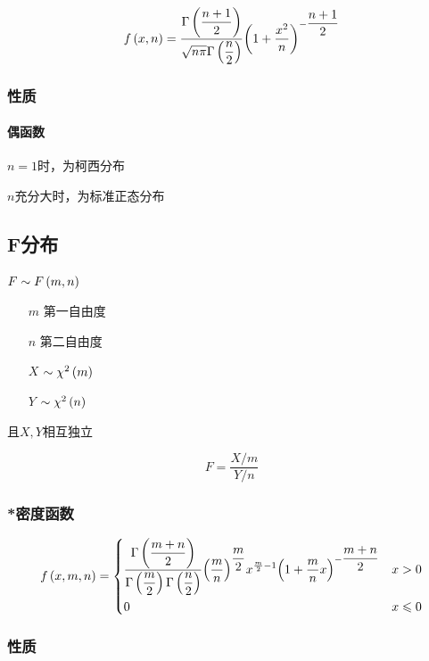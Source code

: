 \documentclass{article}
\begin{document}
\[f\left(x,n\right)=\frac{\Gamma\left(\dfrac{n+1}2\right)}{\sqrt{n\pi}\Gamma\left(\dfrac n2\right)}{\left(1+\frac{x^2}n\right)}^{-\dfrac{n+1}2}\]

\subsubsection{性质}

\paragraph{偶函数}

$n=1$时，为柯西分布

$n$充分大时，为标准正态分布

\subsection{F分布}

$F\sim F\left(m,n\right)$

\begin{enumerate}
    \item [$m$] 第一自由度
    \item [$n$] 第二自由度
    \item [$X$] $\sim\chi^2\left(m\right)$
    \item [$Y$] $\sim\chi^2\left(n\right)$
\end{enumerate}

且$X,Y$相互独立

\[F=\frac{X/m}{Y/n}\]

\subsubsection{*密度函数}

\[f\left(x,m,n\right)=
    \left\{\begin{aligned}
         & \frac{\Gamma\left(\dfrac{m+n}2\right)}{\Gamma\left(\dfrac m2\right)\Gamma\left(\dfrac n2\right)}{\left(\frac mn\right)}^{\dfrac m2}x^{\frac m2-1}{\left(1+\frac mnx\right)}^{-\dfrac{m+n}2} &  & x>0         \\
         & 0                                                                                                                                              &  & x\leqslant0 \\
    \end{aligned}\right.\]

\subsubsection{性质}
\end{document}
